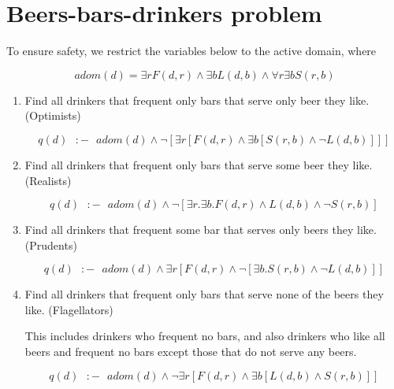 \documentclass[12pt]{article}
\begin{document}
\section{Beers-bars-drinkers problem}

To ensure safety, we restrict the variables below to the active domain,
where

\begin{displaymath}
adom(d) = \exists{r} F(d,r) \land \exists{b} L(d,b) \land \forall{r} \exists{b} S(r,b)
\end{displaymath}

\begin{enumerate}
\item %
Find all drinkers that frequent only bars that serve only beer they
like. (Optimists)

\begin{displaymath}
q(d)\textrm{ } :- \textrm{ } adom(d) \land \lnot [\exists{r} [F(d,r) \land \exists{b}[S(r,b)\land \lnot L(d,b) ]]]
\end{displaymath}

\item %
Find all drinkers that frequent only bars that serve some beer they
like. (Realists)

\begin{displaymath}
q(d)\textrm{ } :- \textrm{ } adom(d) \land \lnot [\exists{r}.\exists{b}. F(d,r) \land L(d,b) \land \lnot S(r,b)]
\end{displaymath}

\item %
Find all drinkers that frequent some bar that serves only beers
they like. (Prudents)

\begin{displaymath}
q(d)\textrm{ } :- \textrm{ } adom(d) \land \exists{r} [F(d,r) \land \lnot [\exists{b}. S(r,b) \land \lnot L(d,b)]]
\end{displaymath}

\item %
Find all drinkers that frequent only bars that serve none of the
beers they like. (Flagellators)

This includes drinkers who frequent no bars, and also drinkers who like
all beers and frequent no bars except those that do not serve any beers.

\begin{displaymath}
q(d)\textrm{ } :- \textrm{ } adom(d) \land \lnot \exists{r} [F(d,r) \land \exists{b} [L(d,b) \land S(r,b)]]
\end{displaymath}

\end{enumerate}
\end{document}
